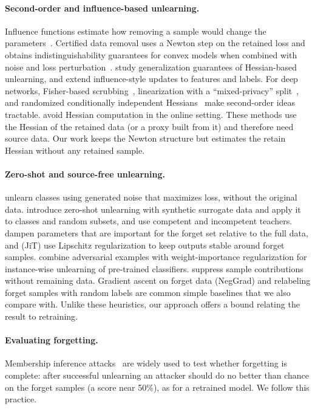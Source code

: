 \documentclass[10pt,twocolumn,letterpaper]{article}
\begin{document}
\paragraph{Second-order and influence-based unlearning.}
Influence functions estimate how removing a sample would change the parameters~\cite{koh2017understanding}. Certified data removal uses a Newton step on the retained loss and obtains indistinguishability guarantees for convex models when combined with noise and loss perturbation~\cite{guo2020certified}. \cite{sekhari2021remember} study generalization guarantees of Hessian-based unlearning, and \cite{warnecke2023machine} extend influence-style updates to features and labels. For deep networks, Fisher-based scrubbing~\cite{golatkar2020eternal,golatkar2020forgetting}, linearization with a ``mixed-privacy'' split~\cite{golatkar2021mixed}, and randomized conditionally independent Hessians~\cite{mehta2022deep} make second-order ideas tractable. \cite{qiao2024hessian} avoid Hessian computation in the online setting. These methods use the Hessian of the retained data (or a proxy built from it) and therefore need source data. Our work keeps the Newton structure but estimates the retain Hessian without any retained sample.

\paragraph{Zero-shot and source-free unlearning.}
\cite{tarun2023fast} unlearn classes using generated noise that maximizes loss, without the original data. \cite{chundawat2023zero} introduce zero-shot unlearning with synthetic surrogate data and apply it to classes and random subsets, and \cite{chundawat2023bad} use competent and incompetent teachers. \cite{foster2024fast} dampen parameters that are important for the forget set relative to the full data, and \cite{foster2024information} (JiT) use Lipschitz regularization to keep outputs stable around forget samples. \cite{cha2024learning} combine adversarial examples with weight-importance regularization for instance-wise unlearning of pre-trained classifiers. \cite{cheng2024remaining} suppress sample contributions without remaining data. Gradient ascent on forget data (NegGrad) and relabeling forget samples with random labels are common simple baselines that we also compare with. Unlike these heuristics, our approach offers a bound relating the result to retraining.

\paragraph{Evaluating forgetting.}
Membership inference attacks~\cite{shokri2017membership} are widely used to test whether forgetting is complete: after successful unlearning an attacker should do no better than chance on the forget samples (a score near 50\%), as for a retrained model. We follow this practice.
\end{document}

